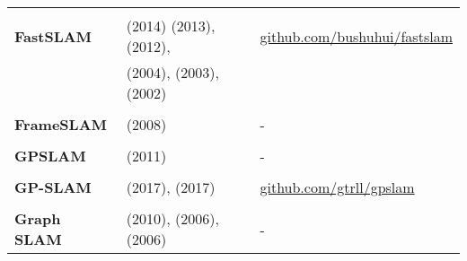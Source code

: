 \documentclass[a4paper,12pt]{scrartcl}
\begin{document}
{\begin{longtable}{l|l|l}
                           &                                                                                             &                                                                       \\ [-3mm]
    \textbf{FastSLAM}      & \cite{Abouzahir2014} (2014) \cite{Naminski2013} (2013), \cite{Kurt-Yavuz2012} (2012),       & {\url{github.com/bushuhui/fastslam}}                                  \\
                           & \cite{Thrun2004} (2004), \cite{Montemerlo2003} (2003), \cite{Montemerlo2002} (2002)         &                                                                       \\
                           &                                                                                             &                                                                       \\ [-3mm]
    \textbf{FrameSLAM}     & \cite{Konolige2008} (2008)                                                                  & -                                                                     \\
                           &                                                                                             &                                                                       \\ [-3mm]
    \textbf{GPSLAM}        & \cite{Pirker2011a} (2011)                                                                   & -                                                                     \\
                           &                                                                                             &                                                                       \\ [-3mm]
    \textbf{GP-SLAM}       & \cite{Yan2017} (2017), \cite{Dong2017} (2017)                                               & {\url{github.com/gtrll/gpslam}}                                       \\
                           &                                                                                             &                                                                       \\ [-3mm]
    \textbf{Graph SLAM}    & \cite{Grisetti2010} (2010), \cite{Olson2006} (2006), \cite{Thrun2006} (2006)                & -                                                                     \\

\end{longtable}}
\end{document}
